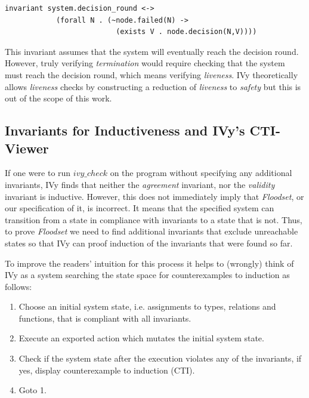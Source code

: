 \documentclass[fleqn]{article}
\begin{document}
\begin{mdframed}[nobreak=true, backgroundcolor=light-gray, roundcorner=10pt,leftmargin=1, rightmargin=1, innerleftmargin=15, innertopmargin=15,innerbottommargin=15, outerlinewidth=1, linecolor=light-gray]
\begin{lstlisting}
invariant system.decision_round <->
            (forall N . (~node.failed(N) ->
                          (exists V . node.decision(N,V))))
\end{lstlisting}
\end{mdframed}
This invariant assumes that the system will eventually reach the decision round. However, truly verifying \textit{termination} would require checking that the system must reach the decision round, which means verifying  \textit{liveness}. IVy theoretically allows \textit{liveness} checks by constructing a reduction of \textit{liveness} to \textit{safety} \cite{live} but this is out of the scope of this work.

\subsection{Invariants for Inductiveness and IVy's CTI-Viewer}
If one were to run $ivy\_check$ on the program without specifying any additional invariants, IVy finds that neither the \textit{agreement} invariant, nor the \textit{validity} invariant is inductive. However, this does not immediately imply that \textit{Floodset}, or our specification of it, is incorrect. It means that the specified system can transition from a state in compliance with invariants to a state that is not. Thus, to prove \textit{Floodset} we need to find additional invariants that exclude unreachable states so that IVy can proof induction of the invariants that were found so far.

To improve the readers' intuition for this process it helps to (wrongly) think of IVy as a system searching the state space for counterexamples to induction as follows:
\begin{enumerate}
  \item Choose an initial system state, i.e. assignments to types, relations and functions, that is compliant with all invariants.
  \item Execute an exported action which mutates the initial system state.
  \item Check if the system state after the execution violates any of the invariants, if yes, display counterexample to induction (CTI).
  \item Goto 1.
\end{enumerate}
\end{document}
